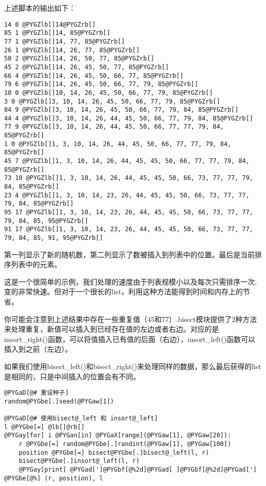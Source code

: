 \documentclass[a4paper,10pt,english]{manual}
\begin{document}
上述脚本的输出如下：

\begin{Verbatim}[commandchars=@\[\]]
14 0 @PYGZlb[]14@PYGZrb[]
85 1 @PYGZlb[]14, 85@PYGZrb[]
77 1 @PYGZlb[]14, 77, 85@PYGZrb[]
26 1 @PYGZlb[]14, 26, 77, 85@PYGZrb[]
50 2 @PYGZlb[]14, 26, 50, 77, 85@PYGZrb[]
45 2 @PYGZlb[]14, 26, 45, 50, 77, 85@PYGZrb[]
66 4 @PYGZlb[]14, 26, 45, 50, 66, 77, 85@PYGZrb[]
79 6 @PYGZlb[]14, 26, 45, 50, 66, 77, 79, 85@PYGZrb[]
10 0 @PYGZlb[]10, 14, 26, 45, 50, 66, 77, 79, 85@PYGZrb[]
3 0 @PYGZlb[]3, 10, 14, 26, 45, 50, 66, 77, 79, 85@PYGZrb[]
84 9 @PYGZlb[]3, 10, 14, 26, 45, 50, 66, 77, 79, 84, 85@PYGZrb[]
44 4 @PYGZlb[]3, 10, 14, 26, 44, 45, 50, 66, 77, 79, 84, 85@PYGZrb[]
77 9 @PYGZlb[]3, 10, 14, 26, 44, 45, 50, 66, 77, 77, 79, 84, 85@PYGZrb[]
1 0 @PYGZlb[]1, 3, 10, 14, 26, 44, 45, 50, 66, 77, 77, 79, 84, 85@PYGZrb[]
45 7 @PYGZlb[]1, 3, 10, 14, 26, 44, 45, 45, 50, 66, 77, 77, 79, 84, 85@PYGZrb[]
73 10 @PYGZlb[]1, 3, 10, 14, 26, 44, 45, 45, 50, 66, 73, 77, 77, 79, 84, 85@PYGZrb[]
23 4 @PYGZlb[]1, 3, 10, 14, 23, 26, 44, 45, 45, 50, 66, 73, 77, 77, 79, 84, 85@PYGZrb[]
95 17 @PYGZlb[]1, 3, 10, 14, 23, 26, 44, 45, 45, 50, 66, 73, 77, 77, 79, 84, 85, 95@PYGZrb[]
91 17 @PYGZlb[]1, 3, 10, 14, 23, 26, 44, 45, 45, 50, 66, 73, 77, 77, 79, 84, 85, 91, 95@PYGZrb[]
\end{Verbatim}

第一列显示了新的随机数，第二列显示了数被插入到列表中的位置。最后是当前排序列表中的元素。

这是一个很简单的示例，我们处理的速度由于列表规模小以及每次只需排序一次, 变的非常快速。但对于一个很长的list，利用这种方法能得到时间和内存上的节省。

你可能会注意到上述结果中存在一些重复值（45和77）.bisect模块提供了2种方法来处理重复，新值可以插入到已经存在值的左边或者右边。对应的是 insort\_right()函数，可以将值插入已有值的后面（右边），insort\_left()函数可以插入到之前（左边）。

如果我们使用bisect\_left()和bisect\_right()来处理同样的数据，那么最后获得的list是相同的，只是中间插入的位置会有不同。

\begin{Verbatim}[commandchars=@\[\]]
@PYGaD[@# 重设种子]
random@PYGbe[.]seed(@PYGaw[1])

@PYGaD[@# 使用bisect@_left 和 insort@_left]
l @PYGbe[=] @lb[]@rb[]
@PYGay[for] i @PYGan[in] @PYGaX[range](@PYGaw[1], @PYGaw[20]):
    r @PYGbe[=] random@PYGbe[.]randint(@PYGaw[1], @PYGaw[100])
    position @PYGbe[=] bisect@PYGbe[.]bisect@_left(l, r)
    bisect@PYGbe[.]insort@_left(l, r)
    @PYGay[print] @PYGad[']@PYGbf[@%2d]@PYGad[ ]@PYGbf[@%2d]@PYGad['] @PYGbe[@%] (r, position), l
\end{Verbatim}
\end{document}
